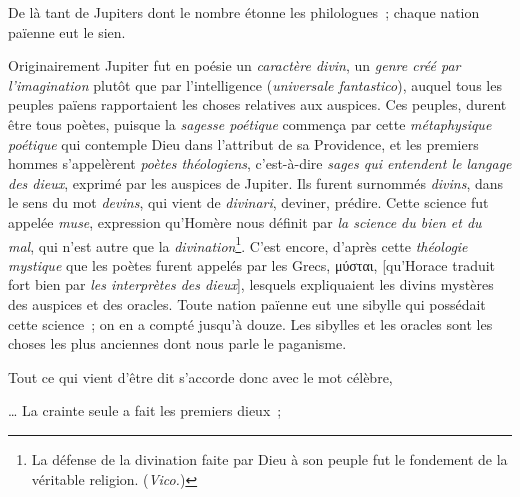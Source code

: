 \documentclass[french,twoside]{book} %
\begin{document}
De là tant de Jupiters dont le nombre étonne les philologues ; chaque nation païenne eut le sien.\par
Originairement Jupiter fut en poésie un {\itshape caractère divin}, un {\itshape genre créé par l’imagination} plutôt que par l’intelligence ({\itshape universale fantastico}), auquel tous les peuples païens rapportaient les choses relatives aux auspices. Ces peuples, durent être tous poètes, puisque la {\itshape sagesse poétique} commença par cette {\itshape métaphysique poétique} qui contemple Dieu dans l’attribut de sa Providence, et les premiers hommes s’appelèrent {\itshape poètes théologiens}, c’est-à-dire {\itshape sages qui entendent le langage des dieux}, exprimé par les auspices de Jupiter. Ils furent surnommés {\itshape divins}, dans le sens du mot {\itshape devins}, qui vient de {\itshape divinari}, deviner, prédire. Cette science fut appelée {\itshape muse}, expression qu’Homère nous définit par {\itshape la science du bien et du mal}, qui n’est autre que la {\itshape divination}\footnote{La défense de la divination faite par Dieu à son peuple fut le fondement de la véritable religion. ({\itshape Vico.})}. C’est encore, d’après cette {\itshape théologie mystique} que les poètes furent appelés par les Grecs, μύσται, [qu’Horace traduit fort bien par \emph{{\itshape les interprètes des dieux}}], lesquels expliquaient les divins mystères des auspices et des oracles. Toute nation païenne eut une sibylle qui possédait cette science ; on en a compté jusqu’à douze. Les sibylles  et les oracles sont les choses les plus anciennes dont nous parle le paganisme.\par
\par
Tout ce qui vient d’être dit s’accorde donc avec le mot célèbre,\par

… La crainte seule a fait les premiers dieux ;\\
\end{document}
